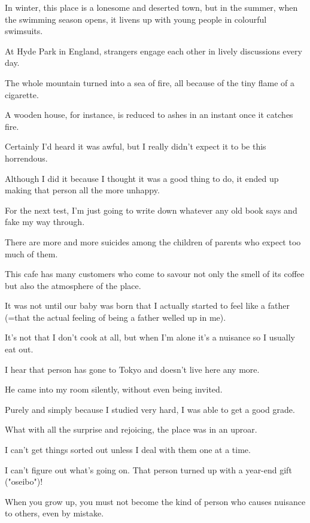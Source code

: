\item[177.] In winter, this place is a lonesome and deserted town, but in the summer, when the swimming season opens, it livens up with young people in colourful swimsuits.
\item[178.] At Hyde Park in England, strangers engage each other in lively discussions every day.
\item[179.] The whole mountain turned into a sea of fire, all because of the tiny flame of a cigarette.
\item[180.] A wooden house, for instance, is reduced to ashes in an instant once it catches fire.
\item[181.] Certainly I'd heard it was awful, but I really didn't expect it to be this horrendous.
\item[182.] Although I did it because I thought it was a good thing to do, it ended up making that person all the more unhappy.
\item[183.] For the next test, I'm just going to write down whatever any old book says and fake my way through.
\item[184.] There are more and more suicides among the children of parents who expect too much of them.
\item[185.] This cafe has many customers who come to savour not only the smell of its coffee but also the atmosphere of the place.
\item[186.] It was not until our baby was born that I actually started to feel like a father (=that the actual feeling of being a father welled up in me).
\item[187.] It's not that I don't cook at all, but when I'm alone it's a nuisance so I usually eat out.
\item[188.] I hear that person has gone to Tokyo and doesn't live here any more.
\item[189.] He came into my room silently, without even being invited.
\item[190.] Purely and simply because I studied very hard, I was able to get a good grade.
\item[191.] What with all the surprise and rejoicing, the place was in an uproar.
\item[192.] I can't get things sorted out unless I deal with them one at a time.
\item[193.] I can't figure out what's going on.  That person turned up with a year-end gift ("oseibo")!
\item[194.] When you grow up, you must not become the kind of person who causes nuisance to others, even by mistake.
